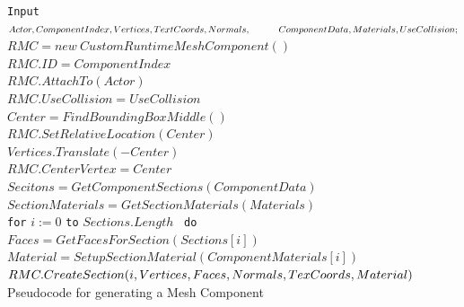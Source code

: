 \begin{algorithm}[htpb]
	\texttt{Input} $Actor, ComponentIndex, Vertices, TextCoords, Normals, \linebreak \null \quad\quad \quad ComponentData, Materials, UseCollision;$\\
	$RMC = new \: CustomRuntimeMeshComponent()$\\
	$RMC.ID = ComponentIndex$\\
	$RMC.AttachTo(Actor)$\\
	$RMC.UseCollision = UseCollision$\\
	$Center = FindBoundingBoxMiddle()$\\
	$RMC.SetRelativeLocation(Center)$\\
	$Vertices.Translate(-Center)$\\
	$RMC.CenterVertex = Center$\\
	$Secitons = GetComponentSections(ComponentData)$\\
	$SectionMaterials = GetSectionMaterials(Materials)$\\
	\texttt{for} $i := 0$ \texttt{to} $Sections.Length$ ~\texttt{do}\\
	\hspace{5mm} $Faces = GetFacesForSection(Sections[i])$\\
	\hspace{5mm} $Material = SetupSectionMaterial(ComponentMaterials[i])$\\
	\hspace{5mm} $RMC.CreateSection(i, Vertices, Faces, Normals, TexCoords, Material)\newline$\\
	
	\caption{Pseudocode for generating a Mesh Component}
	\label{algo:MeshGeneration}
\end{algorithm}

